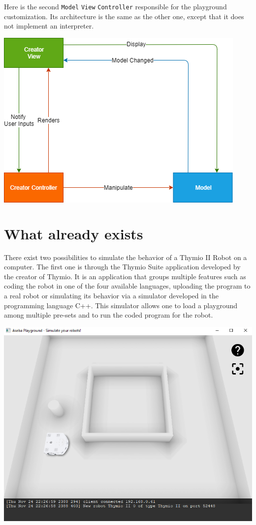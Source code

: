 \documentclass{scrreprt}
\begin{document}
Here is the second \texttt{Model} \texttt{View} \texttt{Controller} responsible for the playground customization. Its architecture is the same as the other one, except that it does not implement an interpreter. 

\begin{center}
  \includegraphics[width=\textwidth]{./architecture_proposal-Page-2}
\end{center}

\chapter{What already exists} 

There exist two possibilities to simulate the behavior of a Thymio II Robot on a computer. 
The first one is through the Thymio Suite application developed by the creator of Thymio. 
It is an application that groups multiple features such as coding the robot in one of the four available languages, 
uploading the program to a real robot or simulating its behavior via a simulator developed in the programming language C++. 
This simulator allows one to load a playground among multiple pre-sets and to run the coded program for the robot.

\begin{center}
  \includegraphics[width=\textwidth]{./suite_simulator}
\end{center}
\end{document}
